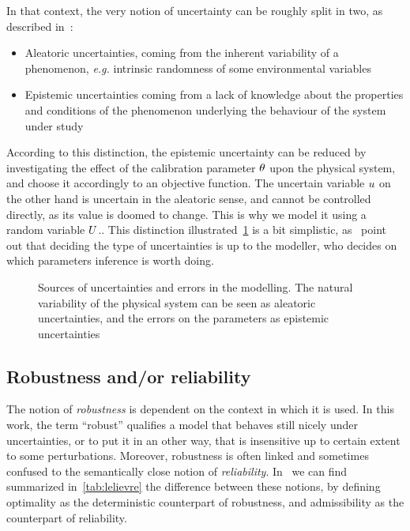 \documentclass[../../Main_ManuscritThese.tex]{subfiles}
\begin{document}
In that context, the very notion of uncertainty can be roughly split in two, as described in~\cite{walker_defining_2003}:
\begin{itemize}
\item Aleatoric uncertainties, coming from the inherent variability of a phenomenon, \emph{e.g.} intrinsic randomness of some environmental variables
\item Epistemic uncertainties coming from a lack of knowledge about the properties and conditions of the phenomenon underlying the behaviour of the system under study
\end{itemize}
According to this distinction,  the epistemic uncertainty can be reduced by investigating the effect of the calibration parameter $\theta$ upon the physical system, and choose it accordingly to an objective function.
The uncertain variable $u$ on the other hand is uncertain in the aleatoric sense, and cannot be controlled directly, as its value is doomed to change. This is why we model it using a random variable $U$.. This distinction illustrated~\cref{fig:sources_uncertainties} is a bit simplistic, as~\cite{kiureghian_aleatory_2009} point out that deciding the type of uncertainties is up to the modeller, who decides on which parameters inference is worth doing.

\begin{figure}[ht]
  \begin{center}
  \resizebox{\linewidth}{!}
  {
      
    }
    \end{center}
  \caption{\label{fig:sources_uncertainties} Sources of uncertainties and errors in the modelling. The natural variability of the physical system can be seen as aleatoric uncertainties, and the errors on the parameters as epistemic uncertainties}
\end{figure}

\subsection{Robustness and/or reliability}
The notion of \emph{robustness} is dependent on the context in which it is used. In this work, the term ``robust'' qualifies a model that behaves still nicely under uncertainties, or to put it in an other way, that is insensitive up to certain extent to some perturbations.
Moreover, robustness is often linked and sometimes confused to the semantically close notion of \emph{reliability}. In~\cite{lelievre_consideration_2016} we can find summarized in~\cref{tab:lelievre} the difference between these notions, by defining optimality as the deterministic counterpart of robustness, and admissibility as the counterpart of reliability.
\end{document}
